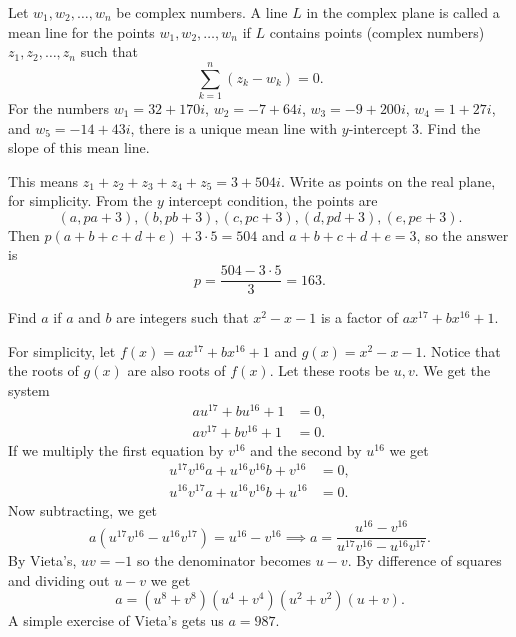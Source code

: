 \documentclass[11pt]{article}
\theoremstyle{definition}
\begin{document}
\begin{question}[name={1988 AIME, \href{https://artofproblemsolving.com/community/c4p458040}{Problem 11}}]
	Let $w_1, w_2, \dots, w_n$ be complex numbers. A line $L$ in the complex plane is called a mean line for the points $w_1, w_2, \dots, w_n$ if $L$ contains points (complex numbers) $z_1, z_2, \dots, z_n$ such that
	\[ \sum_{k = 1}^n (z_k - w_k) = 0. \]
	For the numbers $w_1 = 32 + 170i$, $w_2 = -7 + 64i$, $w_3 = -9 +200i$, $w_4 = 1 + 27i$, and $w_5 = -14 + 43i$, there is a unique mean line with $y$-intercept 3. Find the slope of this mean line.
\end{question}


\begin{solution}[name={Solution by OlympusHero}]
	This means $z_1+z_2+z_3+z_4+z_5=3+504i$. Write as points on the real plane, for simplicity. From the $y$ intercept condition, the points are $$(a,pa+3), (b,pb+3), (c,pc+3), (d,pd+3), (e,pe+3).$$ Then $p(a+b+c+d+e)+3 \cdot 5=504$ and $a+b+c+d+e=3$, so the answer is $$p=\frac{504-3 \cdot 5}{3} = \boxed{163}.$$
\end{solution}






\begin{question}[name={1988 AIME, \href{https://artofproblemsolving.com/community/c4p458060}{Problem 13}}]
	Find $a$ if $a$ and $b$ are integers such that $x^2 - x - 1$ is a factor of $ax^{17} + bx^{16} + 1$.	
\end{question}


\begin{solution}[name={Solution by bobthegod78}]
	For simplicity, let $f(x) =ax^{17} + bx^{16} + 1$ and $g(x) = x^2-x-1$. Notice that the roots of $g(x)$ are also roots of $f(x)$. Let these roots be $u,v$. We get the system\begin{align*} au^{17} + bu^{16} + 1 &= 0, \\ av^{17} + bv^{16} + 1 &= 0. \end{align*}If we multiply the first equation by $v^{16}$ and the second by $u^{16}$ we get\begin{align*} u^{17} v^{16} a + u^{16} v^{16} b + v^{16} &= 0, \\ u^{16} v^{17} a + u^{16} v^{16} b + u^{16} &= 0. \end{align*}Now subtracting, we get\[a(u^{17}v^{16} -u^{16} v^{17}) = u^{16}-v^{16} \implies a = \frac{u^{16} - v^{16}}{u^{17}v^{16} -u^{16} v^{17}}.\]By Vieta's, $uv=-1$ so the denominator becomes $u-v$. By difference of squares and dividing out $u-v$ we get\[a= (u^8+v^8)(u^4+v^4)(u^2+v^2)(u+v).\]A simple exercise of Vieta's gets us $a= \boxed{987}.$
\end{solution}
\end{document}

